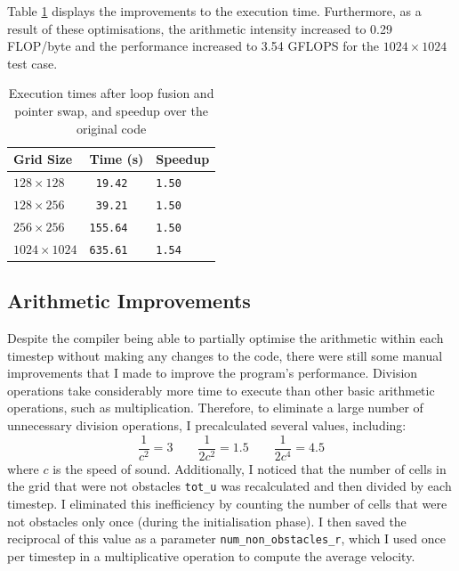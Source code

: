 \documentclass[twocolumn, a4paper]{article}
\begin{document}
Table \ref{tab:loop_fusion_pointer_swap} displays the improvements to the execution time.
Furthermore, as a result of these optimisations, the arithmetic intensity increased to 0.29 FLOP/byte and the performance increased to 3.54 GFLOPS for the $1024 \times 1024$ test case.

\begin{table}[htbp]
  \begin{center}
  \caption{Execution times after loop fusion and pointer swap, and speedup over the original code}\label{tab:loop_fusion_pointer_swap}
  \begin{tabular}{l | l l} 
      \hline\hline
      Grid Size&Time (s)&Speedup\\
      \hline
      $128 \times 128$&\texttt{ 19.42}&\texttt{1.50}\\
      $128 \times 256$&\texttt{ 39.21}&\texttt{1.50}\\
      $256 \times 256$&\texttt{155.64}&\texttt{1.50}\\
      $1024 \times 1024$&\texttt{635.61}&\texttt{1.54}\\
      \hline
    \end{tabular}
  \end{center}
\end{table}

\subsection{Arithmetic Improvements}

Despite the compiler being able to partially optimise the arithmetic within each timestep without making any changes to the code, there were still some manual improvements that I made to improve the program's performance.
Division operations take considerably more time to execute than other basic arithmetic operations, such as multiplication.
Therefore, to eliminate a large number of unnecessary division operations, I precalculated several values, including:
\[
    \frac{1}{c^2} = 3\qquad
    \frac{1}{2c^2} = 1.5\qquad
    \frac{1}{2c^4} = 4.5
\]
where $c$ is the speed of sound.
Additionally, I noticed that the number of cells in the grid that were not obstacles \texttt{tot\_u} was recalculated and then divided by each timestep.
I eliminated this inefficiency by counting the number of cells that were not obstacles only once (during the initialisation phase).
I then saved the reciprocal of this value as a parameter \texttt{num\_non\_obstacles\_r}, which I used once per timestep in a multiplicative operation to compute the average velocity.
\end{document}
